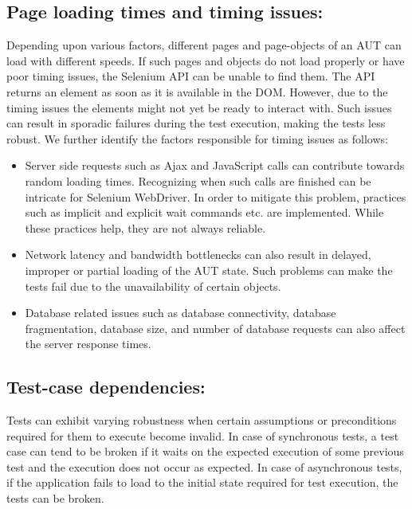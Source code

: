 \subsection{Page loading times and timing issues:}
\label{sec:PageLoadingTimes}
Depending upon various factors, different pages and page-objects of an AUT can load with different speeds. If such pages and objects do not load properly or have poor timing issues, the Selenium API can be unable to find them. The API returns an element as soon as it is available in the DOM. However, due to the timing issues the elements might not yet be ready to interact with. Such issues can result in sporadic failures during the test execution, making the tests less robust. We further identify the factors responsible for timing issues as follows: 

\begin{itemize}
  \item Server side requests such as Ajax and JavaScript calls can contribute towards random loading times. Recognizing when such calls are finished can be intricate for Selenium WebDriver. In order to mitigate this problem, practices such as implicit and explicit wait commands etc. are implemented. While these practices help, they are not always reliable.
  
  \item Network latency and bandwidth bottlenecks can also result in delayed, improper or partial loading of the AUT state. Such problems can make the tests fail due to the unavailability of certain objects.
  
  \item Database related issues such as database connectivity, database fragmentation, database size, and number of database requests can also affect the server response times.
\end{itemize}

\subsection{Test-case dependencies: }
\label{sec:TestDependency}
Tests can exhibit varying robustness when certain assumptions or preconditions required for them to execute become invalid. In case of synchronous tests, a test case can tend to be broken if it waits on the expected execution of some previous test and the execution does not occur as expected. In case of asynchronous tests, if the application fails to load to the initial state required for test execution, the tests can be broken.

